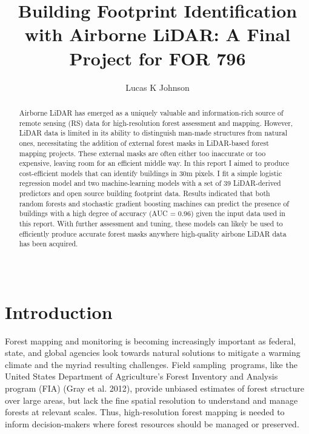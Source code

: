 \documentclass[]{elsarticle} %
\begin{document}
\begin{frontmatter}

  \title{Building Footprint Identification with Airborne LiDAR: A Final Project for FOR 796}
    \author[]{Lucas K Johnson}
  
      
  \begin{abstract}
  Airborne LiDAR has emerged as a uniquely valuable and information-rich source
  of remote sensing (RS) data for high-resolution forest assessment and mapping.
  However, LiDAR data is limited in its ability to distinguish man-made
  structures from natural ones, necessitating the addition of external forest
  masks in LiDAR-based forest mapping projects.
  These external masks are often either too inaccurate or too expensive,
  leaving room for an efficient middle way.
  In this report I aimed to produce cost-efficient models that can identify
  buildings in 30m pixels.
  I fit a simple logistic regression model and two machine-learning
  models with a set of 39 LiDAR-derived predictors and open source building
  footprint data.
  Results indicated that both random forests and stochastic gradient boosting
  machines can predict the presence of buildings with a high degree of accuracy
  (AUC = 0.96) given the input data used in this report.
  With further assessment and tuning, these models can likely be used to
  efficiently produce accurate forest masks anywhere high-quality airbone LiDAR
  data has been acquired.

  \,
  \end{abstract}
  
 \end{frontmatter}

\hypertarget{introduction}{%
\section{Introduction}\label{introduction}}

Forest mapping and monitoring is becoming increasingly important as
federal, state, and global agencies look towards natural solutions
to mitigate a warming climate and the myriad resulting challenges.
Field sampling~programs,
like the United States Department of Agriculture's Forest Inventory and Analysis
program (FIA) (Gray et al. 2012),
provide unbiased estimates of forest structure over large areas,
but lack the fine spatial resolution to understand and manage forests at
relevant scales.
Thus, high-resolution forest mapping is needed to inform decision-makers where
forest resources should be managed or preserved.
\end{document}
